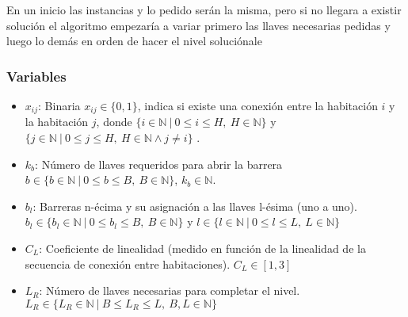 \documentclass[letter, 10pt]{article}
\begin{document}
En un inicio las instancias y lo pedido ser\'an la misma, pero si no llegara a existir soluci\'on el algoritmo empezar\'ia a variar primero las llaves necesarias pedidas y luego lo dem\'as en orden de hacer el nivel soluci\'onale

\subsubsection*{Variables}
\begin{itemize}
    \item $x_{ij}$: Binaria $x_{ij} \in \{0,1\}$, indica si existe una conexi\'on entre la habitaci\'on $i$ y la habitaci\'on $j$, donde $\{i \in \mathbb{N} \ |\ 0\leq i \leq H,\ H \in \mathbb{N}\}$ y $\{j \in \mathbb{N} \ |\ 0\leq j \leq H,\ H \in \mathbb{N} \land j \neq i\}$ .
    
    \item $k_b$: N\'umero de llaves requeridos para abrir la barrera $b \in \{b \in \mathbb{N} \ |\ 0\leq b \leq B,\ B \in \mathbb{N}\}$, $k_b \in \mathbb{N}$.
    
    \item $b_{l}$: Barreras n-\'ecima y su asignaci\'on a las llaves l-\'esima (uno a uno). $b_{l} \in \{b_{l} \in \mathbb{N} \ |\ 0\leq b_{l} \leq B,\ B \in \mathbb{N}\}$ y $l \in \{l \in \mathbb{N} \ |\ 0\leq l \leq L,\ L \in \mathbb{N}\}$
    
    \item $C_L$: Coeficiente de linealidad (medido en funci\'on de la linealidad de la secuencia de conexi\'on entre habitaciones). $C_L \in [1,3]$
    
    \item $L_R$: N\'umero de llaves necesarias para completar el nivel. $L_R \in \{L_R \in \mathbb{N} \ |\ B\leq L_R \leq L,\ B,L\in \mathbb{N}\}$
\end{itemize}
\end{document}
